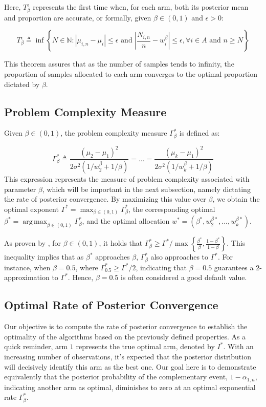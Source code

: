 \documentclass[a4paper, 12pt]{article}
\DeclareMathOperator{\argmax}{arg\,max}
\theoremstyle{definition}
\begin{document}
Here, $T_\beta^\epsilon$ represents the first time when, for each arm, both its posterior mean and proportion are accurate, or formally, given $\beta \in (0,1)$ and $\epsilon > 0$:

\[
T_\beta^\epsilon \triangleq \inf \left\{N\in\mathbb{N}: |\mu_{i,n}-\mu_i|\leq\epsilon \text{ and } \left|\frac{N_{i,n}}{n}-w_i^\beta\right|\leq\epsilon, \forall i\in A \text{ and } n\geq N\right\}  
\]

This theorem assures that as the number of samples tends to infinity, the proportion of samples allocated to each arm converges to the optimal proportion dictated by $\beta$.


\subsection{Problem Complexity Measure}

Given $\beta\in(0,1)$, the problem complexity measure $\Gamma_\beta^*$ is defined as:

\[
\Gamma_\beta^* \triangleq \frac{(\mu_2-\mu_1)^2}{2\sigma^2 \left(1/w_2^\beta + 1/\beta \right)} = ... = \frac{(\mu_k-\mu_1)^2}{2\sigma^2 \left(1/w_k^\beta + 1/\beta \right)}
\]
This expression represents the measure of problem complexity associated with parameter $\beta$, which will be important in the next subsection, namely dictating the rate of posterior convergence. By maximizing this value over $\beta$, we obtain the optimal exponent $\Gamma^* = \max_{\beta\in(0,1)}\Gamma_\beta^*$, the corresponding optimal $\beta^* = \argmax_{\beta\in(0,1)}\Gamma_\beta^*$, and the optimal allocation $w^* = \left(\beta^*, w_2^{\beta*}, ..., w_k^{\beta*}\right)$.

As proven by \cite{toptwo}, for $\beta\in(0,1)$, it holds that $\Gamma_\beta^* \geq \Gamma^*/\max{}\left\{\frac{\beta^*}{\beta},\frac{1-\beta^*}{1-\beta}\right\}$. This inequality implies that as $\beta^*$ approaches $\beta$, $\Gamma_\beta^*$ also approaches to $\Gamma^*$. For instance, when $\beta = 0.5$, where $\Gamma_{0.5}^* \geq \Gamma^*/2$, indicating that $\beta=0.5$ guarantees a 2-approximation to $\Gamma^*$. Hence, $\beta=0.5$ is often considered a good default value.


\subsection{Optimal Rate of Posterior Convergence}
Our objective is to compute the rate of posterior convergence to establish the optimality of the algorithms based on the previously defined properties. As a quick reminder, arm $1$ represents the true optimal arm, denoted by $I^*$. With an increasing number of observations, it's expected that the posterior distribution will decisively identify this arm as the best one. Our goal here is to demonstrate equivalently that the posterior probability of the complementary event, $1-\alpha_{1,n}$, indicating another arm as optimal, diminishes to zero at an optimal exponential rate $\Gamma_\beta^*$.
\end{document}
